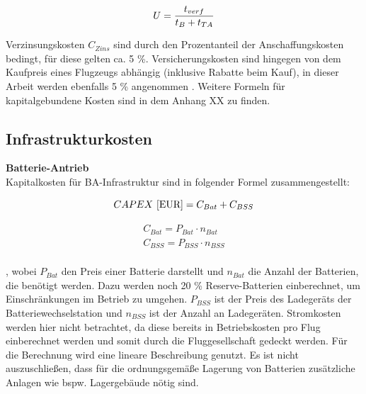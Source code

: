 \begin{equation}
   U = \frac{t_{verf}}{t_B + t_{TA}} \\
   \label{utilisation}
\end{equation}

Verzinsungskosten $C_{Zins}$ sind durch den Prozentanteil der Anschaffungskosten bedingt, für diese gelten ca. 5 \%. 
Versicherungskosten sind hingegen von dem Kaufpreis eines Flugzeugs abhängig (inklusive Rabatte beim Kauf), 
in dieser Arbeit werden ebenfalls 5 \% angenommen \cite{scholz_design_evaluation_doc}. 
Weitere Formeln für kapitalgebundene Kosten sind in dem Anhang XX zu finden. %
%
\subsection{Infrastrukturkosten}

\textbf{Batterie-Antrieb}\\
Kapitalkosten für BA-Infrastruktur sind in folgender Formel zusammengestellt:

\begin{equation}
     {CAPEX ~[\text{EUR}]} = C_{Bat} + C_{BSS} \\ %
     \label{BA_Infrastruktur}
  \end{equation}

\begin{equation}
   \begin{split}
  {C_{Bat}} = P_{Bat} \cdot n_{Bat}  \\
  {C_{BSS}} = P_{BSS} \cdot n_{BSS} \\
  \label{BA}
   \end{split}
  \end{equation}

, wobei $P_{Bat}$ den Preis einer Batterie darstellt und $n_{Bat}$ die Anzahl der Batterien, die benötigt werden. 
Dazu werden noch 20 \% Reserve-Batterien einberechnet, um Einschränkungen im Betrieb zu umgehen. 
$P_{BSS}$ ist der Preis des Ladegeräts der Batteriewechselstation und $n_{BSS}$ ist der Anzahl an Ladegeräten. 
Stromkosten werden hier nicht betrachtet, da diese bereits in Betriebskosten 
pro Flug einberechnet werden und somit durch die Fluggesellschaft gedeckt werden. 
Für die Berechnung wird eine lineare Beschreibung genutzt. 
Es ist nicht auszuschließen, dass für die ordnungsgemäße Lagerung 
von Batterien zusätzliche Anlagen wie bspw. Lagergebäude nötig sind.
  
